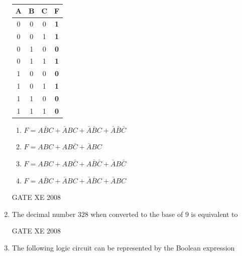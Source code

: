 \documentclass[12pt]{article}
\begin{document}
\begin{enumerate}[label=Q\arabic*.]
\begin{table}[H]     \centering     \caption{}     \label{}     \begin{tabular}{c|c|c|c}
    A & B & C & \textbf{F}  \\
    \hline
    0 & 0 & 0 & \textbf{1}   \\
    \hline
    0 & 0 & 1 & \textbf{1}  \\
    \hline
    0 & 1 & 0 & \textbf{0} \\
    \hline
    0 & 1 & 1 & \textbf{1} \\
    \hline
    1 & 0 & 0 & \textbf{0} \\
    \hline
    1 & 0 & 1 & \textbf{1} \\
    \hline
    1 & 1 & 0 & \textbf{0} \\
    \hline
    1 & 1 & 1 & \textbf{0} \\
    \hline
\end{tabular} \end{table}

\begin{enumerate}[label=(\Alph*)]
\item  $F=A\bar{B}C + \bar{A}BC +\bar{A}\bar{B}C + \bar{A}\bar{B}\bar{C}$
\item  $F=ABC + AB\bar{C} + \bar{A}BC$
\item  $F=ABC + AB\bar{C} +A\bar{B}\bar{C} +\bar{A}B\bar{C}$
\item  $F=A\bar{B}C + \bar{A}BC + \bar{A}\bar{B}C + \bar{A}BC$
\end{enumerate}

GATE XE 2008
\item  The decimal number $328$ when converted to the base of $9$ is equivalent to

\begin{enumerate}[label=(\Alph*)]
\end{enumerate}

GATE XE 2008
\item  The following logic circuit can be represented by the Boolean expression


\end{enumerate}
\end{document}

